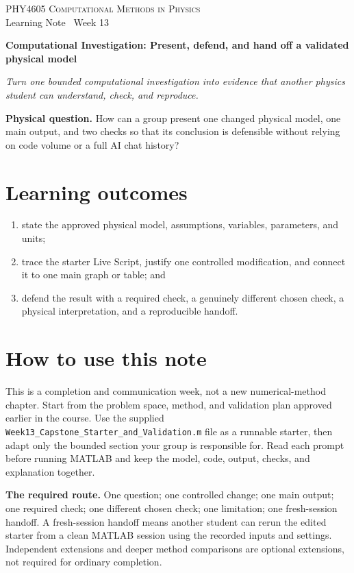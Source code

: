 \documentclass[11pt,a4paper]{article}
\newcommand{\course}{PHY4605 Computational Methods in Physics}
\begin{document}
{\large\textsc{\course}}\\[-2pt]
{\small Learning Note \textbar\ Week 13}\par\vspace{4pt}
{\LARGE\bfseries Computational Investigation: Present, defend, and hand off a validated physical model}\par\vspace{3pt}
\textit{Turn one bounded computational investigation into evidence that another physics student can understand, check, and reproduce.}
\begin{keybox}\textbf{Physical question.} How can a group present one changed physical model, one main output, and two checks so that its conclusion is defensible without relying on code volume or a full AI chat history?\end{keybox}
\section*{Learning outcomes}
\begin{enumerate}[nosep,leftmargin=5mm]
\item state the approved physical model, assumptions, variables, parameters, and units;
\item trace the starter Live Script, justify one controlled modification, and connect it to one main graph or table; and
\item defend the result with a required check, a genuinely different chosen check, a physical interpretation, and a reproducible handoff.
\end{enumerate}
\section*{How to use this note}
This is a completion and communication week, not a new numerical-method chapter. Start from the problem space, method, and validation plan approved earlier in the course. Use the supplied \texttt{Week13\_Capstone\_Starter\_and\_Validation.m} file as a runnable starter, then adapt only the bounded section your group is responsible for. Read each prompt before running MATLAB and keep the model, code, output, checks, and explanation together.
\begin{keybox}\textbf{The required route.} One question; one controlled change; one main output; one required check; one different chosen check; one limitation; one fresh-session handoff. A fresh-session handoff means another student can rerun the edited starter from a clean MATLAB session using the recorded inputs and settings. Independent extensions and deeper method comparisons are optional extensions, not required for ordinary completion.\end{keybox}
\end{document}
